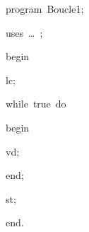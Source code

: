 
{
\parindent {}
\medskip

\carrenoir
\vspace{\neglskip}\mbox{\blc  \idt  \mcl program\idt \ Boucle1$;$
}\par 
\vspace{\neglskip}\mbox{\blc \blk\idt \mcl uses\idt \ \ldots\ $;$
}\par 
\vspace{\neglskip}\mbox{\blc  \idt  \mcl begin\idt }\par 
\vspace{\neglskip}\mbox{\blc  \blk\idt  lc$;$}\par 
\pagebreak[3] 
\vspace{\neglskip}\mbox{\blc  \blk\idt  \mcl while\idt \ true\ \mcl do\idt }\par 
\vspace{\neglskip}\mbox{\blc  \blk\blk\idt  \mcl begin\idt }\par 
\vspace{\neglskip}\mbox{\blc  \blk\blk\blk\idt  vd$;$\ }\par 
\vspace{\neglskip}\mbox{\blc  \blk\blk\idt  \mcl end\idt $;$}\par 
\vspace{\neglskip}\mbox{\blc  \blk\idt  st$;$\ }\par 
\vspace{\neglskip}\mbox{\blc  \idt  \mcl end\idt $.$}\par 

\medskip }

